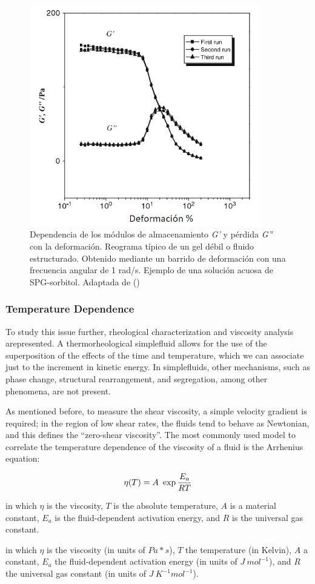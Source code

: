 \begin{figure}\centering
    \includegraphics[width=0.9\textwidth]{Graphics/weak_gel}
    \caption[Reograma de un gel débil.]{Dependencia de los módulos de almacenamiento \emph{G'} y pérdida \emph{G''} con la deformación. Reograma típico de un gel débil o fluido estructurado. Obtenido mediante un barrido de deformación con una frecuencia angular de 1 rad/s. Ejemplo de una solución acuosa de SPG-sorbitol. Adaptada de (\cite{Nishinari2009})}
    \label{fig:estructurado}
\end{figure}

\subsubsection{Temperature Dependence}
To study this issue further, rheological characterization and viscosity analysis arepresented. A thermorheological simplefluid allows for the use of the superposition of the effects of the time and temperature, which we can associate just to the increment in kinetic energy.
In simplefluids, other mechanisms, such as phase change, structural rearrangement, and segregation, among other phenomena, are not present.

As mentioned before, to measure the shear viscosity, a simple velocity gradient is required; in the region of low shear rates, the fluids tend to behave as Newtonian, and this defines the “zero-shear viscosity”. The most commonly used model to correlate the temperature dependence of the viscosity of a fluid is the Arrhenius equation:

\begin{equation}\centering
\eta(T) = A~\exp{ \frac{E_{a}}{RT} } 
\end{equation}

in which $\eta$ is the viscosity, $T$ is the absolute temperature, $A$ is a material constant, $E_{a}$ is the fluid-dependent activation energy, and $R$ is the universal gas constant.

in which $\eta$ is the viscosity (in units of $Pa*s$), $T$ the temperature (in Kelvin), $A$ a constant, $E_{a}$ the fluid-dependent activation energy (in units of $J~mol^{-1}$), and $R$ the universal gas constant (in units of $J~K^{-1} mol^{-1}$).
